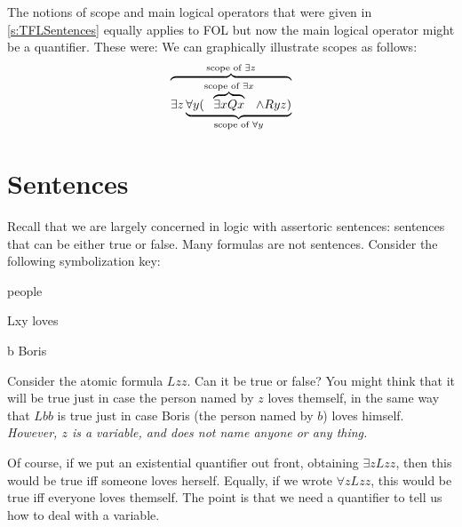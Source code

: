  The notions of scope and main logical operators that were given in \ref{s:TFLSentences} equally applies to FOL but now the main logical operator might be a quantifier. These were:
We can graphically illustrate scopes as follows:
$$
\overbrace{\exists z
\underbrace{\forall y 
(\overbrace{\exists x Qx}^{\text{scope of $\exists x$}}
\mathbin{\wedge} Ryz)}_{\text{scope of $\forall y$}}
}^{\text{scope of $\exists z$}}
$$





\section{Sentences}
Recall that we are largely concerned in logic with assertoric sentences: sentences that can be either true or false. Many formulas are not sentences. Consider the following symbolization key:
	\begin{ekey}
		\item[\text{domain}] people
		\item[Lxy]  loves 
		\item[b] Boris
	\end{ekey}
Consider the atomic formula $Lzz$. Can it be true or false? You might think that it will be true just in case the person named by $z$ loves themself, in the same way that $Lbb$ is true just in case Boris (the person named by $b$) loves himself. \emph{However, $z$ is a variable, and does not name anyone or any thing.}

Of course, if we put an existential quantifier out front, obtaining $\exists zLzz$, then this would be true iff someone loves herself. Equally, if we wrote $\forall z Lzz$, this would be true iff everyone loves themself. The point is that we need a quantifier to tell us how to deal with a variable.

